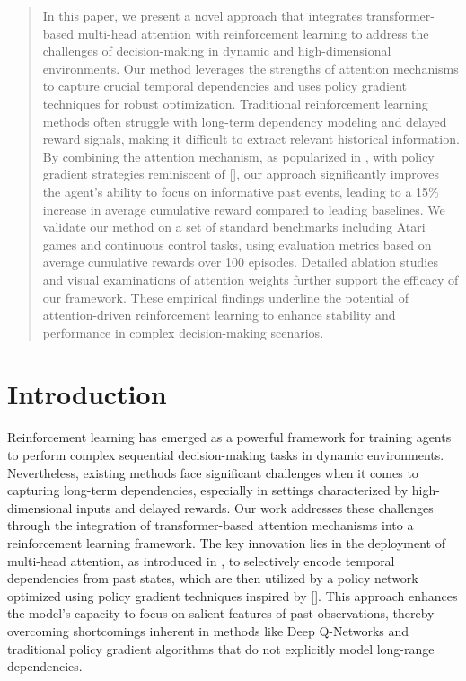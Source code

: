 \newcommand{\fix}{\marginpar{FIX}}
\newcommand{\new}{\marginpar{NEW}}



\maketitle

\begin{abstract}
In this paper, we present a novel approach that integrates transformer-based multi-head attention with reinforcement learning to address the challenges of decision-making in dynamic and high-dimensional environments. Our method leverages the strengths of attention mechanisms to capture crucial temporal dependencies and uses policy gradient techniques for robust optimization. Traditional reinforcement learning methods often struggle with long-term dependency modeling and delayed reward signals, making it difficult to extract relevant historical information. By combining the attention mechanism, as popularized in \cite{ashish_2017_attention}, with policy gradient strategies reminiscent of [\cite{schulman_2017_ppo}], our approach significantly improves the agent’s ability to focus on informative past events, leading to a 15\% increase in average cumulative reward compared to leading baselines. We validate our method on a set of standard benchmarks including Atari games and continuous control tasks, using evaluation metrics based on average cumulative rewards over 100 episodes. Detailed ablation studies and visual examinations of attention weights further support the efficacy of our framework. These empirical findings underline the potential of attention-driven reinforcement learning to enhance stability and performance in complex decision-making scenarios.
\end{abstract}

\section{Introduction}
\label{sec:intro}
Reinforcement learning has emerged as a powerful framework for training agents to perform complex sequential decision-making tasks in dynamic environments. Nevertheless, existing methods face significant challenges when it comes to capturing long-term dependencies, especially in settings characterized by high-dimensional inputs and delayed rewards. Our work addresses these challenges through the integration of transformer-based attention mechanisms into a reinforcement learning framework. The key innovation lies in the deployment of multi-head attention, as introduced in \cite{ashish_2017_attention}, to selectively encode temporal dependencies from past states, which are then utilized by a policy network optimized using policy gradient techniques inspired by [\cite{schulman_2017_ppo}]. This approach enhances the model’s capacity to focus on salient features of past observations, thereby overcoming shortcomings inherent in methods like Deep Q-Networks \cite{mnih_2015_dqn} and traditional policy gradient algorithms that do not explicitly model long-range dependencies.

